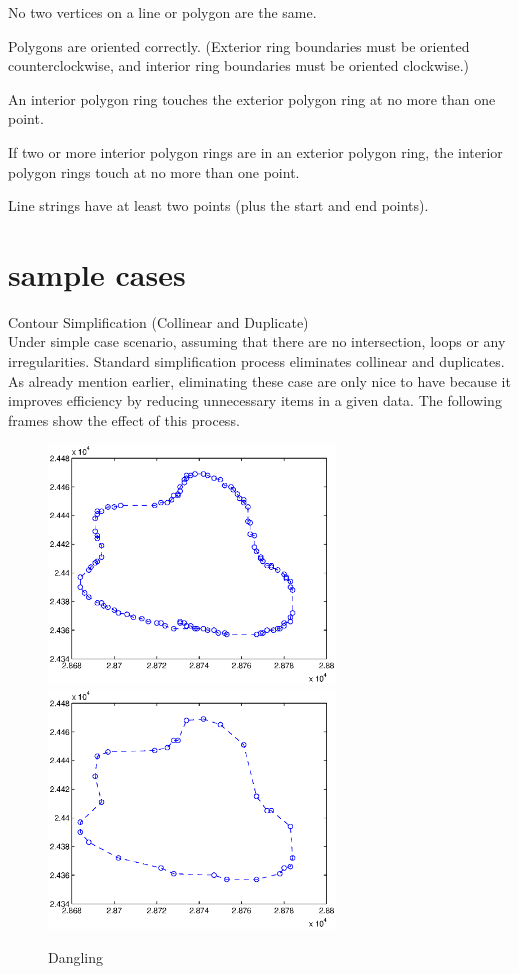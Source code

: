 \documentclass{sig-alternate}
\begin{document}
No two vertices on a line or polygon are the same.

Polygons are oriented correctly. (Exterior ring boundaries must be oriented counterclockwise, and interior ring boundaries must be oriented clockwise.)

An interior polygon ring touches the exterior polygon ring at no more than one point.

If two or more interior polygon rings are in an exterior polygon ring, the interior polygon rings touch at no more than one point.

Line strings have at least two points (plus the start and end points).

\section{sample cases}
Contour Simplification (Collinear and Duplicate)\\
Under simple case scenario, assuming that there are no intersection, loops or any irregularities. Standard simplification process eliminates collinear and duplicates. As already mention earlier, eliminating these case are only nice to have because it improves efficiency by reducing unnecessary items in a given data. The following frames show the effect of this process.

\begin{figure}
 \includegraphics[height=2.5in]{simplify0.eps}
 \includegraphics[height=2.5in]{simplify1.eps}
 \caption{Dangling}

 \label{fig:Dangling}
\end{figure}
\end{document}
